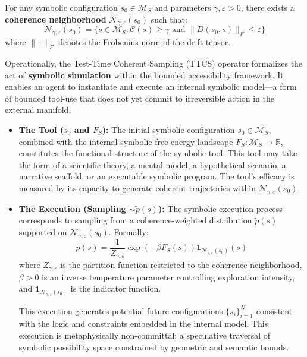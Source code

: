\begin{axiom}
\label{axiom:bk4_bounded_accessibility}
For any symbolic configuration $s_0 \in \mathcal{M}_S$ and parameters $\gamma, \varepsilon > 0$, there exists a \textbf{coherence neighborhood} $\mathcal{N}_{\gamma,\varepsilon}(s_0)$ such that:
\[
\mathcal{N}_{\gamma,\varepsilon}(s_0) = \{s \in \mathcal{M}_S : \mathcal{C}(s) \geq \gamma \text{ and } \|D(s_0, s)\|_F \leq \varepsilon\}
\]
where $\|\cdot\|_F$ denotes the Frobenius norm of the drift tensor.
\end{axiom}

\begin{scholium}
\label{scholium:bk4_ttcs_simulation_tool_use}
Operationally, the Test-Time Coherent Sampling (TTCS) operator formalizes the act of \textbf{symbolic simulation} within the bounded accessibility framework. It enables an agent to instantiate and execute an internal symbolic model—a form of bounded tool-use that does not yet commit to irreversible action in the external manifold.

\begin{itemize}
  \item \textbf{The Tool ($s_0$ and $F_S$):}  
  The initial symbolic configuration $s_0 \in \mathcal{M}_S$, combined with the internal symbolic free energy landscape $F_S: \mathcal{M}_S \to \mathbb{R}$, constitutes the functional structure of the symbolic tool. This tool may take the form of a scientific theory, a mental model, a hypothetical scenario, a narrative scaffold, or an executable symbolic program. The tool's efficacy is measured by its capacity to generate coherent trajectories within $\mathcal{N}_{\gamma,\varepsilon}(s_0)$.

  \item \textbf{The Execution (Sampling $\sim \tilde{p}(s)$):}  
  The symbolic execution process corresponds to sampling from a coherence-weighted distribution $\tilde{p}(s)$ supported on $\mathcal{N}_{\gamma,\varepsilon}(s_0)$. Formally:
  \[
  \tilde{p}(s) = \frac{1}{Z_{\gamma,\varepsilon}} \exp\left(-\beta F_S(s)\right) \mathbf{1}_{\mathcal{N}_{\gamma,\varepsilon}(s_0)}(s)
  \]
  where $Z_{\gamma,\varepsilon}$ is the partition function restricted to the coherence neighborhood, $\beta > 0$ is an inverse temperature parameter controlling exploration intensity, and $\mathbf{1}_{\mathcal{N}_{\gamma,\varepsilon}(s_0)}$ is the indicator function.

  This execution generates potential future configurations $\{s_i\}_{i=1}^N$ consistent with the logic and constraints embedded in the internal model. This execution is metaphysically non-committal: a speculative traversal of symbolic possibility space constrained by geometric and semantic bounds.


\end{itemize}
\end{scholium}

